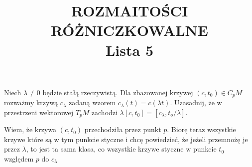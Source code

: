 \documentclass{article}
\title{ROZMAITOŚCI RÓŻNICZKOWALNE\\{\normalsize Lista 5}}
\author{}
\date{}
\begin{document}
\maketitle\thispagestyle{empty}

\begin{problem}[]{}
  Niech $\lambda\neq0$ będzie stałą rzeczywistą. Dla zbazowanej krzywej $(c, t_0)\in C_pM$ rozważmy krzywą $c_\lambda$ zadaną wzorem $c_\lambda(t)=c(\lambda t)$. Uzasadnij, że w przestrzeni wektorowej $T_pM$ zachodzi $\lambda[c, t_0]=[c_\lambda, t_o/\lambda]$.
\end{problem}

Wiem, że krzywa $(c, t_0)$ przechodziła przez punkt $p$. Biorę teraz wszystkie krzywe które są w tym punkcie styczne i chcę powiedzieć, że jeżeli przemnożę je przez $\lambda$, to jest ta sama klasa, co wszystkie krzywe styczne w punkcie $t_0$ względem $p$ do $c_\lambda$
\end{document}
